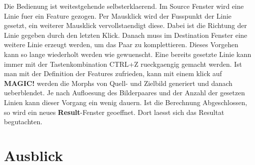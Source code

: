 Die Bedienung ist weitestgehende selbsterklaerend. Im Source
Fenster wird eine Linie fuer ein Feature gezogen. Per
Mausklick wird der Fusspunkt der Linie gesetzt, ein weiterer
Mausklick vervollstaendigt diese. Dabei ist die Richtung der Linie
gegeben durch den letzten Klick. Danach muss
im Destination Fenster eine weitere Linie erzeugt werden, um das
Paar zu komplettieren. Dieses Vorgehen kann so lange wiederholt
werden wie gewuenscht. Eine bereits gesetzte Linie kann immer mit
der Tastenkombination CTRL+Z rueckgaengig gemacht werden.
Ist man mit der Definition der Features zufrieden, kann mit einem
klick auf \textbf{MAGIC!} werden die Morphs von Quell- und Zielbild
generiert und danach ueberblendet. Je nach Aufloesung des Bilderpaares
und der Anzahl der gesetzen Linien kann dieser Vorgang ein wenig
dauern. Ist die Berechnung Abgeschlossen, so wird ein
neues \textbf{Result}-Fenster geoeffnet. Dort laesst sich das
Resultat begutachten.

\section{Ausblick}



